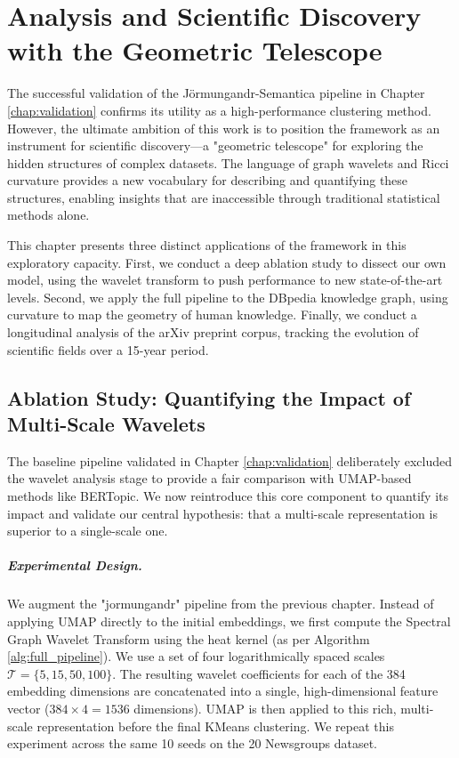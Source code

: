 \chapter{Analysis and Scientific Discovery with the Geometric Telescope}
\label{chap:discovery}

The successful validation of the Jörmungandr-Semantica pipeline in Chapter \ref{chap:validation} confirms its utility as a high-performance clustering method. However, the ultimate ambition of this work is to position the framework as an instrument for scientific discovery—a "geometric telescope" for exploring the hidden structures of complex datasets. The language of graph wavelets and Ricci curvature provides a new vocabulary for describing and quantifying these structures, enabling insights that are inaccessible through traditional statistical methods alone.

This chapter presents three distinct applications of the framework in this exploratory capacity. First, we conduct a deep ablation study to dissect our own model, using the wavelet transform to push performance to new state-of-the-art levels. Second, we apply the full pipeline to the DBpedia knowledge graph, using curvature to map the geometry of human knowledge. Finally, we conduct a longitudinal analysis of the arXiv preprint corpus, tracking the evolution of scientific fields over a 15-year period.

\section{Ablation Study: Quantifying the Impact of Multi-Scale Wavelets}
\label{sec:ablation}
The baseline pipeline validated in Chapter \ref{chap:validation} deliberately excluded the wavelet analysis stage to provide a fair comparison with UMAP-based methods like BERTopic. We now reintroduce this core component to quantify its impact and validate our central hypothesis: that a multi-scale representation is superior to a single-scale one.

\paragraph{Experimental Design.} We augment the "jormungandr" pipeline from the previous chapter. Instead of applying UMAP directly to the initial embeddings, we first compute the Spectral Graph Wavelet Transform using the heat kernel (as per Algorithm \ref{alg:full_pipeline}). We use a set of four logarithmically spaced scales $\mathcal{T}=\{5, 15, 50, 100\}$. The resulting wavelet coefficients for each of the 384 embedding dimensions are concatenated into a single, high-dimensional feature vector ($384 \times 4 = 1536$ dimensions). UMAP is then applied to this rich, multi-scale representation before the final KMeans clustering. We repeat this experiment across the same 10 seeds on the 20 Newsgroups dataset.

